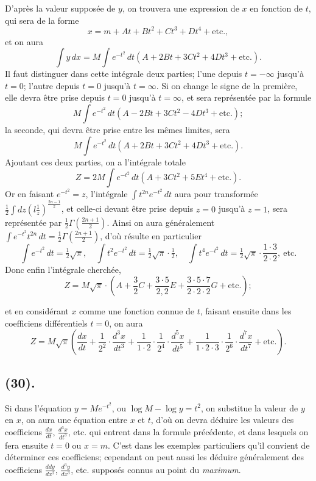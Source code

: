 \documentclass{article}
\begin{document}
D'après la valeur supposée de $y$, on trouvera une expression de $x$ en fonction de $t$, qui sera de la forme
\[ x=m+At+Bt^{2}+Ct^{3}+Dt^{4}+\text{etc.}, \]
et on aura
\[ \int y\,dx=M\int e^{-t^{2}}\,dt(A+2Bt+3Ct^{2}+4Dt^{3}+\text{etc.}). \]
Il faut distinguer dans cette intégrale deux parties; l'une depuis $t=-\infty$ jusqu'à $t=0$; l'autre depuis $t=0$ jusqu'à $t=\infty$. Si on change le signe de la première, elle devra être prise depuis $t=0$ jusqu'à $t=\infty$, et sera représentée par la formule
\[ M\int e^{-t^{2}}\,dt(A-2Bt+3Ct^{2}-4Dt^{3}+\text{etc.}); \]
la seconde, qui devra être prise entre les mêmes limites, sera
\[ M\int e^{-t^{2}}\,dt(A+2Bt+3Ct^{2}+4Dt^{3}+\text{etc.}). \]
Ajoutant ces deux parties, on a l'intégrale totale
\[ Z=2M\int e^{-t^{2}}\,dt(A+3Ct^{2}+5Et^{4}+\text{etc.}). \]
Or en faisant $e^{-t^{2}}=z$, l'intégrale $\displaystyle\int t^{2n}e^{-t^{2}}\,dt$ aura pour transformée $\frac{1}{2}\displaystyle\int dz\left(l\frac{1}{z}\right)^{\frac{2n-1}{2}}$, et celle-ci devant être prise depuis $z=0$ jusqu'à $z=1$, sera représentée par $\frac{1}{2}\Gamma\left(\frac{2n+1}{2}\right)$. Ainsi on aura généralement $\displaystyle\int e^{-t^{2}}t^{2n}\,dt=\frac{1}{2}\Gamma\left(\frac{2n+1}{2}\right)$, d'où résulte en particulier
\[ \int e^{-t^{2}}\,dt=\tfrac{1}{2}\sqrt{\pi},\quad \int t^{2}e^{-t^{2}}\,dt=\tfrac{1}{2}\sqrt{\pi}\cdot\tfrac{1}{2},\quad \int t^{4}e^{-t^{2}}\,dt=\tfrac{1}{2}\sqrt{\pi}\cdot\frac{1\cdot3}{2\cdot2},\ \text{etc.} \]
Donc enfin l'intégrale cherchée,
\[ Z=M\sqrt{\pi}\cdot\left(A+\frac{3}{2}C+\frac{3\cdot5}{2,2}E+\frac{3\cdot5\cdot7}{2\cdot2\cdot2}G+\text{etc.}\right); \tag{1} \]

et en considérant $x$ comme une fonction connue de $t$, faisant ensuite dans les coefficiens différentiels $t=0$, on aura
\[ Z=M\sqrt{\pi}\left(\frac{dx}{dt}+\frac{1}{2^{2}}\cdot\frac{d^{3}x}{dt^{3}}+\frac{1}{1\cdot2}\cdot\frac{1}{2^{4}}\cdot\frac{d^{5}x}{dt^{5}}+\frac{1}{1\cdot2\cdot3}\cdot\frac{1}{2^{6}}\cdot\frac{d^{7}x}{dt^{7}}+\text{etc.}\right). \]

\subsection*{(30).}

Si dans l'équation $y=Me^{-t^{2}}$, ou $\log M-\log y=t^{2}$, on substitue la valeur de $y$ en $x$, on aura une équation entre $x$ et $t$, d'où on devra déduire les valeurs des coefficiens $\frac{dx}{dt}$, $\frac{d^{3}x}{dt^{3}}$, etc. qui entrent dans la formule précédente, et dans lesquels on fera ensuite $t=0$ ou $x=m$. C'est dans les exemples particuliers qu'il convient de déterminer ces coefficiens; cependant on peut aussi les déduire généralement des coefficiens $\frac{ddy}{dx^{2}}$, $\frac{d^{3}y}{dx^{3}}$, etc. supposés connus au point du \emph{maximum}.
\end{document}
